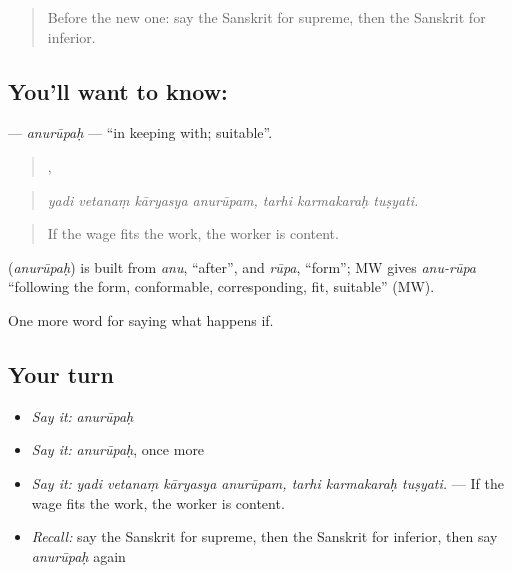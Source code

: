\begin{quote}
Before the new one: say the Sanskrit for supreme, then the Sanskrit for inferior.
\end{quote}

\subsection*{You'll want to know: }
\textbf{} — \emph{anurūpaḥ} — \textquotedblleft{}in keeping with; suitable\textquotedblright{}.

\begin{quote}
   ,   
\end{quote}

\begin{quote}
\emph{yadi vetanaṃ kāryasya anurūpam, tarhi karmakaraḥ tuṣyati.}
\end{quote}

\begin{quote}
If the wage fits the work, the worker is content.
\end{quote}

\begin{cousinweb}
\textbf{} (\emph{anurūpaḥ}) is built from \emph{anu}, \textquotedblleft{}after\textquotedblright{}, and \emph{rūpa}, \textquotedblleft{}form\textquotedblright{}; MW gives \emph{anu-rūpa} \textquotedblleft{}following the form, conformable, corresponding, fit, suitable\textquotedblright{} (MW).
\end{cousinweb}

\begin{grammarlens}[title={What you've built}]
One more word for saying what happens if.
\end{grammarlens}

\subsection*{Your turn}
\begin{itemize}
\raggedright
  \item \emph{Say it:} \emph{anurūpaḥ}
  \item \emph{Say it:} \emph{anurūpaḥ}, once more
  \item \emph{Say it:} \emph{yadi vetanaṃ kāryasya anurūpam, tarhi karmakaraḥ tuṣyati.} — If the wage fits the work, the worker is content.
  \item \emph{Recall:} say the Sanskrit for supreme, then the Sanskrit for inferior, then say \emph{anurūpaḥ} again
\end{itemize}

